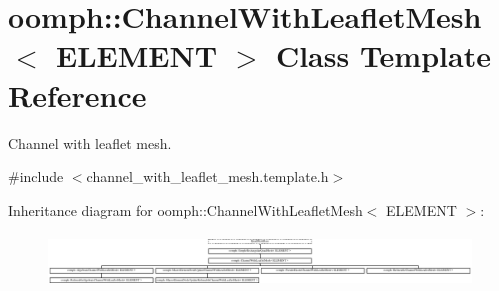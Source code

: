 \hypertarget{classoomph_1_1ChannelWithLeafletMesh}{}\section{oomph\+:\+:Channel\+With\+Leaflet\+Mesh$<$ E\+L\+E\+M\+E\+NT $>$ Class Template Reference}
\label{classoomph_1_1ChannelWithLeafletMesh}


Channel with leaflet mesh.  




{\ttfamily \#include $<$channel\+\_\+with\+\_\+leaflet\+\_\+mesh.\+template.\+h$>$}

Inheritance diagram for oomph\+:\+:Channel\+With\+Leaflet\+Mesh$<$ E\+L\+E\+M\+E\+NT $>$\+:\begin{figure}[H]
\begin{center}
\leavevmode
\includegraphics[height=1.414141cm]{classoomph_1_1ChannelWithLeafletMesh}
\end{center}
\end{figure}
